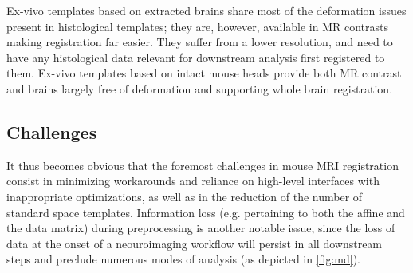 Ex-vivo templates based on extracted brains share most of the deformation issues present in histological templates;
they are, however, available in MR contrasts making registration far easier.
They suffer from a lower resolution, and need to have any histological data relevant for downstream analysis first registered to them.
Ex-vivo templates based on intact mouse heads provide both MR contrast and brains largely free of deformation and supporting whole brain registration.

\subsection{Challenges}
It thus becomes obvious that the foremost challenges in mouse MRI registration consist in minimizing workarounds and reliance on high-level interfaces with inappropriate optimizations, as well as in the reduction of the number of standard space templates.
Information loss (e.g. pertaining to both the affine and the data matrix) during preprocessing is another notable issue, since the loss of data at the onset of a neouroimaging workflow will persist in all downstream steps and preclude numerous modes of analysis (as depicted in \cref{fig:md}).

